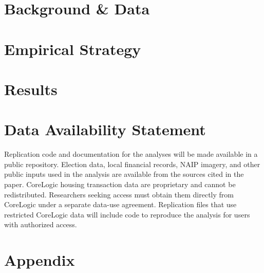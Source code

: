 \documentclass[12pt]{article}
\begin{document}


\section{Background \& Data} \label{sec:data}



\section{Empirical Strategy} \label{sec:empirical}



\section{Results} \label{sec:result}



\section*{Data Availability Statement}
Replication code and documentation for the analyses will be made available in a public repository. Election data, local financial records, NAIP imagery, and other public inputs used in the analysis are available from the sources cited in the paper. CoreLogic housing transaction data are proprietary and cannot be redistributed. Researchers seeking access must obtain them directly from CoreLogic under a separate data-use agreement. Replication files that use restricted CoreLogic data will include code to reproduce the analysis for users with authorized access.



\singlespacing
\setlength\bibsep{6pt}

% 



\clearpage

\appendix
\section*{Appendix} \label{sec:appendix}

\end{document}
